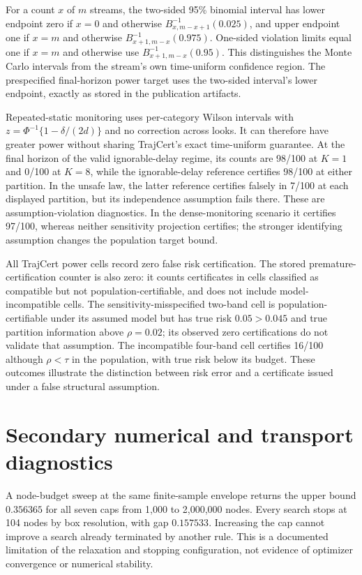 For a count $x$ of $m$ streams, the two-sided 95\% binomial interval has lower endpoint zero if $x=0$ and otherwise $B^{-1}_{x,m-x+1}(0.025)$, and upper endpoint one if $x=m$ and otherwise $B^{-1}_{x+1,m-x}(0.975)$. One-sided violation limits equal one if $x=m$ and otherwise use $B^{-1}_{x+1,m-x}(0.95)$. This distinguishes the Monte Carlo intervals from the stream's own time-uniform confidence region. The prespecified final-horizon power target uses the two-sided interval's lower endpoint, exactly as stored in the publication artifacts.

Repeated-static monitoring uses per-category Wilson intervals with $z=\Phi^{-1}\{1-\delta/(2d)\}$ and no correction across looks. It can therefore have greater power without sharing TrajCert's exact time-uniform guarantee. At the final horizon of the valid ignorable-delay regime, its counts are 98/100 at $K=1$ and 0/100 at $K=8$, while the ignorable-delay reference certifies 98/100 at either partition. In the unsafe law, the latter reference certifies falsely in 7/100 at each displayed partition, but its independence assumption fails there. These are assumption-violation diagnostics. In the dense-monitoring scenario it certifies 97/100, whereas neither sensitivity projection certifies; the stronger identifying assumption changes the population target bound.

All TrajCert power cells record zero false risk certification. The stored premature-certification counter is also zero: it counts certificates in cells classified as compatible but not population-certifiable, and does not include model-incompatible cells. The sensitivity-misspecified two-band cell is population-certifiable under its assumed model but has true risk $0.05>0.045$ and true partition information above $\rho=0.02$; its observed zero certifications do not validate that assumption. The incompatible four-band cell certifies 16/100 although $\rho<\tau$ in the population, with true risk below its budget. These outcomes illustrate the distinction between risk error and a certificate issued under a false structural assumption.

\section{Secondary numerical and transport diagnostics}
A node-budget sweep at the same finite-sample envelope returns the upper bound $0.356365$ for all seven caps from 1,000 to 2,000,000 nodes. Every search stops at 104 nodes by box resolution, with gap $0.157533$. Increasing the cap cannot improve a search already terminated by another rule. This is a documented limitation of the relaxation and stopping configuration, not evidence of optimizer convergence or numerical stability.

